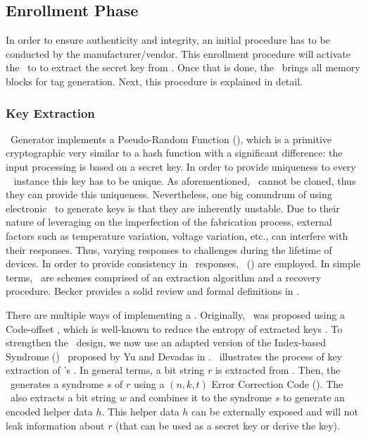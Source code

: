 \subsection{Enrollment Phase}
\label{subsec:Enrollment-Phase}

In order to ensure authenticity and integrity, an initial procedure has to be conducted by the manufacturer\slash{}vendor. This enrollment procedure will activate the \fuzzy~to to extract the secret key from \pufs. Once that is done, the \handler~brings all memory blocks for tag generation. Next, this procedure is explained in detail.

\subsubsection{Key Extraction}
\label{subsubsec:Key-Extraction}

\ptag~Generator implements a Pseudo-Random Function (\prf), which is a primitive cryptographic very similar to a hash function with a significant difference: the input processing is based on a secret key. In order to provide uniqueness to every \cshia~ instance this key has to be unique. As aforementioned, \pufs~cannot be cloned, thus they can provide this uniqueness. Nevertheless, one big conundrum of using electronic \pufs~to generate keys is that they are inherently unstable. Due to their nature of leveraging on the imperfection of the fabrication process, external factors such as temperature variation, voltage variation, etc., can interfere with their responses. Thus, varying responses to challenges during the lifetime of devices. In order to provide consistency in \puf~responses, \fuzzy~(\fe) are employed. In simple terms, \fes~are schemes comprised of an extraction algorithm and a recovery procedure. Becker provides a solid review and formal definitions in \cite{Becker2017:RobustFuzzyExtractor}.

There are multiple ways of implementing a \fuzzy. Originally, \cshia~was proposed using a Code-offset \fe, which is well-known to reduce the entropy of extracted keys \cite{Armknecht2011:Formalization}. To strengthen the \cshia~design, we now use an adapted version of the Index-based Syndrome (\ibs) \fe~proposed by Yu and Devadas in \cite{Yu2010:RobustErrorCorrection}. \fenroll~illustrates the process of key extraction of \cshia's \fe. In general terms, a bit string $r$ is extracted from \pufs. Then, the \fe~generates a syndrome $s$ of $r$ using a $(n,k,t)$ Error Correction Code (\ecc). The \fe~also extracts a bit string $w$ and combines it to the syndrome $s$ to generate an encoded helper data $h$. This helper data $h$ can be externally exposed and will not leak information about $r$ (that can be used as a secret key or derive the key).


